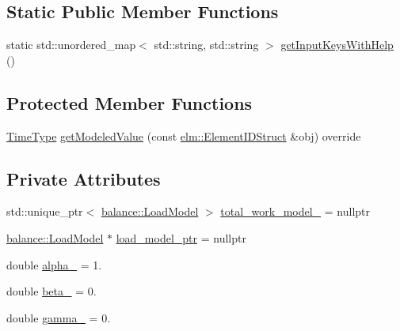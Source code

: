 \subsection*{Static Public Member Functions}
\begin{DoxyCompactItemize}
\item 
static std\+::unordered\+\_\+map$<$ std\+::string, std\+::string $>$ \hyperlink{structvt_1_1vrt_1_1collection_1_1lb_1_1_tempered_w_min_a30e2c27a7d127db53f268916fe8cbee2}{get\+Input\+Keys\+With\+Help} ()
\end{DoxyCompactItemize}
\subsection*{Protected Member Functions}
\begin{DoxyCompactItemize}
\item 
\hyperlink{namespacevt_a876a9d0cd5a952859c72de8a46881442}{Time\+Type} \hyperlink{structvt_1_1vrt_1_1collection_1_1lb_1_1_tempered_w_min_a80d9e3a0dd25bbe3183bd3d3f54c6af2}{get\+Modeled\+Value} (const \hyperlink{structvt_1_1elm_1_1_element_i_d_struct}{elm\+::\+Element\+I\+D\+Struct} \&obj) override
\end{DoxyCompactItemize}
\subsection*{Private Attributes}
\begin{DoxyCompactItemize}
\item 
std\+::unique\+\_\+ptr$<$ \hyperlink{structvt_1_1vrt_1_1collection_1_1balance_1_1_load_model}{balance\+::\+Load\+Model} $>$ \hyperlink{structvt_1_1vrt_1_1collection_1_1lb_1_1_tempered_w_min_a62d4723702739009fbec9861b32b242d}{total\+\_\+work\+\_\+model\+\_\+} = nullptr
\item 
\hyperlink{structvt_1_1vrt_1_1collection_1_1balance_1_1_load_model}{balance\+::\+Load\+Model} $\ast$ \hyperlink{structvt_1_1vrt_1_1collection_1_1lb_1_1_tempered_w_min_a02400fd847cdebdf68d733e166b34cfd}{load\+\_\+model\+\_\+ptr} = nullptr
\item 
double \hyperlink{structvt_1_1vrt_1_1collection_1_1lb_1_1_tempered_w_min_a3c73a78b96830428d3f87b5f930ebef5}{alpha\+\_\+} = 1.
\item 
double \hyperlink{structvt_1_1vrt_1_1collection_1_1lb_1_1_tempered_w_min_abce8c16e0a7656a9df933f54ce7d2256}{beta\+\_\+} = 0.
\item 
double \hyperlink{structvt_1_1vrt_1_1collection_1_1lb_1_1_tempered_w_min_abfdd0a558d47f9e31f8645fc703479db}{gamma\+\_\+} = 0.
\end{DoxyCompactItemize}
